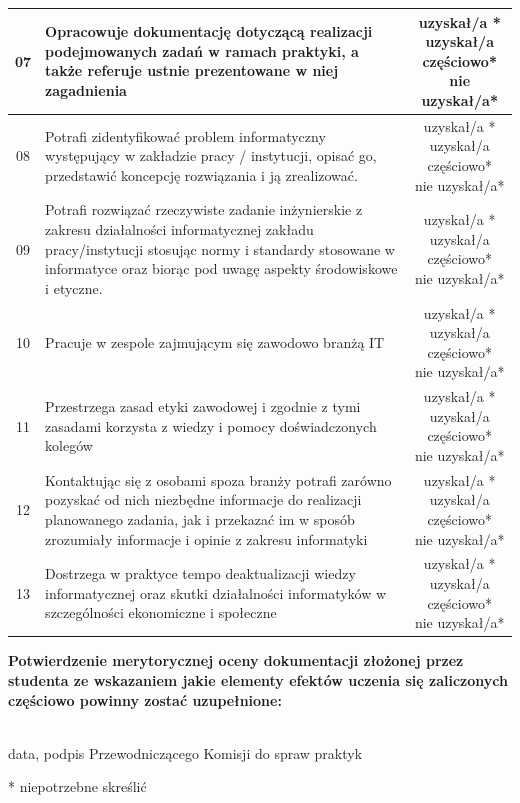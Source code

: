 \documentclass[11pt,a4paper]{article}
\begin{document}
\begin{longtable}{|c|p{10cm}|c|}
07 & Opracowuje dokumentację dotyczącą realizacji podejmowanych zadań w ramach praktyki, a także referuje ustnie prezentowane w niej zagadnienia & \makecell{uzyskał/a *\\ uzyskał/a częściowo*\\ nie uzyskał/a*} \\ \hline
08 & Potrafi zidentyfikować problem informatyczny występujący w zakładzie pracy / instytucji, opisać go, przedstawić koncepcję rozwiązania i ją zrealizować. & \makecell{uzyskał/a *\\ uzyskał/a częściowo*\\ nie uzyskał/a*} \\ \hline
09 & Potrafi rozwiązać rzeczywiste zadanie inżynierskie z zakresu działalności informatycznej zakładu pracy/instytucji stosując normy i standardy stosowane w informatyce oraz biorąc pod uwagę aspekty środowiskowe i etyczne. & \makecell{uzyskał/a *\\ uzyskał/a częściowo*\\ nie uzyskał/a*} \\ \hline
10 & Pracuje w zespole zajmującym się zawodowo branżą IT & \makecell{uzyskał/a *\\ uzyskał/a częściowo*\\ nie uzyskał/a*} \\ \hline
11 & Przestrzega zasad etyki zawodowej i zgodnie z tymi zasadami korzysta z wiedzy i pomocy doświadczonych kolegów & \makecell{uzyskał/a *\\ uzyskał/a częściowo*\\ nie uzyskał/a*} \\ \hline
12 & Kontaktując się z osobami spoza branży potrafi zarówno pozyskać od nich niezbędne informacje do realizacji planowanego zadania, jak i przekazać im w sposób zrozumiały informacje i opinie z zakresu informatyki & \makecell{uzyskał/a *\\ uzyskał/a częściowo*\\ nie uzyskał/a*} \\ \hline
13 & Dostrzega w praktyce tempo deaktualizacji wiedzy informatycznej oraz skutki działalności informatyków w szczególności ekonomiczne i społeczne & \makecell{uzyskał/a *\\ uzyskał/a częściowo*\\ nie uzyskał/a*} \\ \hline
\end{longtable}

\vspace{1em}
\noindent \textbf{Potwierdzenie merytorycznej oceny dokumentacji złożonej przez studenta ze wskazaniem jakie elementy efektów uczenia się zaliczonych częściowo powinny zostać uzupełnione:}

\vspace{3em}
\noindent\hfill
\begin{minipage}[t]{0.5\textwidth}
\centering
\dotfill \\
\small data, podpis Przewodniczącego Komisji do spraw praktyk
\end{minipage}

\vspace{2em}
\noindent \footnotesize{* niepotrzebne skreślić} \normalsize
\end{document}
